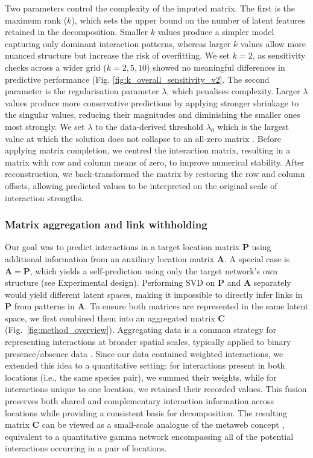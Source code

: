 \documentclass[oneside, a4paper, onecolumn, 11pt]{article}
\newcommand{\revtag}[1]{\textcolor{softcoral}{[#1]}}
\begin{document}
Two parameters control the complexity of the imputed matrix. The first is the maximum rank ($k$), which sets the upper bound on the number of latent features retained in the decomposition. Smaller $k$ values produce a simpler model capturing only dominant interaction patterns, whereas larger $k$ values allow more nuanced structure but increase the risk of overfitting. We set $k = 2$, as sensitivity checks across a wider grid ($k = 2, 5, 10$) showed no meaningful differences in predictive performance (Fig. \ref{fig:k_overall_sensitivity_v2}. %
The second parameter is the regularisation parameter $\lambda$, which penalises complexity. Larger $\lambda$ values produce more conservative predictions by applying stronger shrinkage to the singular values, reducing their magnitudes and diminishing the smaller ones most strongly. We set $\lambda$ to the data-derived threshold $\lambda_0$ which is the largest value at which the solution does not collapse to an all-zero matrix \citep{Hastie2015-qt,Hastie2022-ly}. Before applying matrix completion, we centred the interaction matrix, resulting in a matrix with row and column means of zero, to improve numerical stability. After reconstruction, we back-transformed the matrix by restoring the row and column offsets, allowing predicted values to be interpreted on the original scale of interaction strengths.

\subsubsection{Matrix aggregation and link withholding}
Our goal was to predict interactions in a target location matrix $\mathbf{P}$ using additional information from an auxiliary location matrix $\mathbf{A}$.  A special case is $\mathbf{A}=\mathbf{P}$, which yields a self-prediction using only the target network's own structure (see Experimental design).
Performing SVD on $\mathbf{P}$ and $\mathbf{A}$ separately would yield different latent spaces, making it impossible to directly infer links in $\mathbf{P}$ from patterns in $\mathbf{A}$. 
To ensure both matrices are represented in the same latent space, we first combined them into an aggregated matrix $\mathbf{C}$ (Fig.~\ref{fig:method_overview}). 
Aggregating data is a common strategy for representing interactions at broader spatial scales, typically applied to binary presence/absence data \citep{Strydom2023-rc}. Since our data contained weighted interactions, we extended this idea to a quantitative setting:  
for interactions present in both locations (i.e., the same species pair), we summed their weights, while for interactions unique to one location, we retained their recorded values. 
This fusion preserves both shared and complementary interaction information across locations while providing a consistent basis for decomposition. 
The resulting matrix $\mathbf{C}$ can be viewed as a small-scale analogue of the metaweb concept \citep{Dunne2006-yw,Poisot2012-lp,Strydom2023-rc}, equivalent to a quantitative gamma network encompassing all of the potential interactions occurring in a pair of locations.
\end{document}
